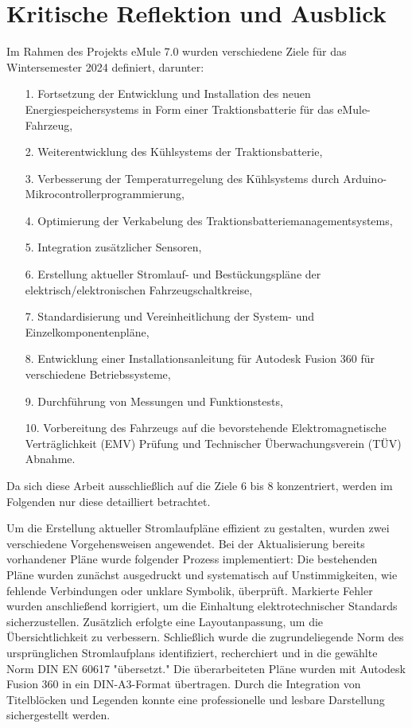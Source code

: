 \chapter{Kritische Reflektion und Ausblick}
\label{cha:zusammenfassung}


Im Rahmen des Projekts eMule 7.0 wurden verschiedene Ziele für das Wintersemester 2024 definiert, darunter:  
\begin{itemize}
	\item[1.] Fortsetzung der Entwicklung und Installation des neuen Energiespeichersystems in Form einer Traktionsbatterie für das eMule-Fahrzeug,
	\item[2.] Weiterentwicklung des Kühlsystems der Traktionsbatterie,
	\item[3.] Verbesserung der Temperaturregelung des Kühlsystems durch Arduino-Mikrocontrollerprogrammierung,
	\item[4.] Optimierung der Verkabelung des Traktionsbatteriemanagementsystems,
	\item[5.] Integration zusätzlicher Sensoren,
	\item[6.] Erstellung aktueller Stromlauf- und Bestückungspläne der \newline elektrisch/elektronischen Fahrzeugschaltkreise,
	\item[7.] Standardisierung und Vereinheitlichung der System- und Einzelkomponentenpläne,
	\item[8.] Entwicklung einer Installationsanleitung für Autodesk Fusion 360 für verschiedene Betriebssysteme,
	\item[9.] Durchführung von Messungen und Funktionstests,
	\item[10.] Vorbereitung des Fahrzeugs auf die bevorstehende Elektromagnetische Verträglichkeit (EMV) Prüfung und Technischer Überwachungsverein (TÜV) Abnahme.
\end{itemize}

Da sich diese Arbeit ausschließlich auf die Ziele 6 bis 8 konzentriert, werden im Folgenden nur diese detailliert betrachtet.  

Um die Erstellung aktueller Stromlaufpläne effizient zu gestalten, wurden zwei verschiedene Vorgehensweisen angewendet. Bei der Aktualisierung bereits vorhandener Pläne wurde folgender Prozess implementiert:  
Die bestehenden Pläne wurden zunächst ausgedruckt und systematisch auf Unstimmigkeiten, wie fehlende Verbindungen oder unklare Symbolik, überprüft. Markierte Fehler wurden anschließend korrigiert, um die Einhaltung elektrotechnischer Standards sicherzustellen. Zusätzlich erfolgte eine Layoutanpassung, um die Übersichtlichkeit zu verbessern. Schließlich wurde die zugrundeliegende Norm des ursprünglichen Stromlaufplans identifiziert, recherchiert und in die gewählte Norm DIN EN 60617 "übersetzt." Die überarbeiteten Pläne wurden mit Autodesk Fusion 360 in ein DIN-A3-Format übertragen. Durch die Integration von Titelblöcken und Legenden konnte eine professionelle und lesbare Darstellung sichergestellt werden.

